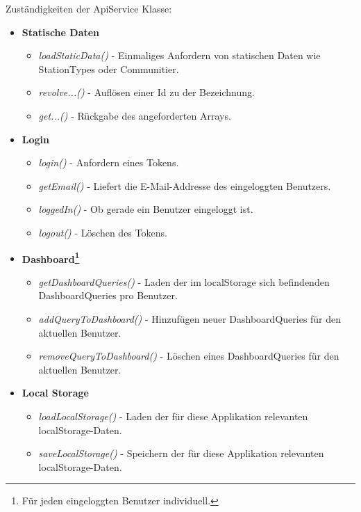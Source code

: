 \documentclass[12pt, letterpaper]{article}
\begin{document}
Zuständigkeiten der ApiService Klasse:
\begin{itemize}
    \item \textbf{Statische Daten}
        \begin{itemize}
            \item \textit{loadStaticData()} - Einmaliges Anfordern von statischen Daten wie StationTypes oder Communitier.
            \item \textit{revolve...()} - Auflösen einer Id zu der Bezeichnung.
            \item \textit{get...()} - Rückgabe des angeforderten Arrays.
        \end{itemize}
    \item \textbf{Login}
    \begin{itemize}
        \item \textit{login()} - Anfordern eines Tokens.
        \item \textit{getEmail()} - Liefert die E-Mail-Addresse des eingeloggten Benutzers.
        \item \textit{loggedIn()} - Ob gerade ein Benutzer eingeloggt ist.
        \item \textit{logout()} - Löschen des Tokens.
    \end{itemize}
    \item \textbf{Dashboard\footnote{Für jeden eingeloggten Benutzer individuell.}}
    \begin{itemize}
        \item \textit{getDashboardQueries()} - Laden der im localStorage sich befindenden DashboardQueries pro Benutzer.
        \item \textit{addQueryToDashboard()} - Hinzufügen neuer DashboardQueries für den aktuellen Benutzer.
        \item \textit{removeQueryToDashboard()} - Löschen eines DashboardQueries für den aktuellen Benutzer.
    \end{itemize}
    \newpage
    
    \item \textbf{Local Storage}
    \begin{itemize}
        \item \textit{loadLocalStorage()} - Laden der für diese Applikation relevanten localStorage-Daten.
        \item \textit{saveLocalStorage()} - Speichern der für diese Applikation relevanten localStorage-Daten.
    \end{itemize}
    

\end{itemize}
\end{document}
